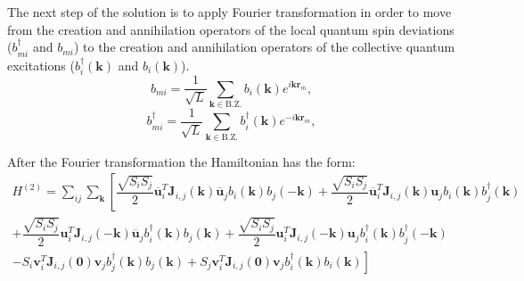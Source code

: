\documentclass[a4paper,12pt]{article}
\begin{document}
        The next step of the solution is to apply Fourier transformation in order to move from the creation and annihilation operators 
        of the local quantum spin deviations ($b^{\dag}_{mi}$ and $b_{mi}$) 
        to the creation and annihilation operators of the collective quantum excitations ($b_i^{\dag}(\boldsymbol{k})$ and $b_i(\boldsymbol{k})$).
        \begin{equation}
            b_{mi} = \dfrac{1}{\sqrt{L}}\sum_{\boldsymbol{k} \in \text{B.Z.}} b_i(\boldsymbol{k})e^{i\boldsymbol{k}\boldsymbol{r}_m},
        \end{equation}
        \begin{equation}
            b^{\dag}_{mi} = \dfrac{1}{\sqrt{L}}\sum_{\boldsymbol{k} \in \text{B.Z.}} b^{\dag}_i(\boldsymbol{k})e^{-i\boldsymbol{k}\boldsymbol{r}_m},
        \end{equation}

        After the Fourier transformation the Hamiltonian has the form:
        \begin{multline}
            H^{(2)} = \sum_{ij}\sum_{\boldsymbol{k}}\left[\dfrac{\sqrt{S_i S_j}}{2}\overline{\boldsymbol{u}}^T_i\boldsymbol{J}_{i,j}(\boldsymbol{k})\overline{\boldsymbol{u}}_jb_{i}(\boldsymbol{k})b_{j}(-\boldsymbol{k}) +
            \dfrac{\sqrt{S_i S_j}}{2} \overline{\boldsymbol{u}}^T_i\boldsymbol{J}_{i,j}(\boldsymbol{k})\boldsymbol{u}_j b_{i}(\boldsymbol{k})b^{\dag}_{j}(\boldsymbol{k})\right. \\+ 
            \dfrac{\sqrt{S_i S_j}}{2}\boldsymbol{u}^T_i\boldsymbol{J}_{i,j}(-\boldsymbol{k})\overline{\boldsymbol{u}}_jb^{\dag}_{i}(\boldsymbol{k})b_{j}(\boldsymbol{k}) +
            \dfrac{\sqrt{S_i S_j}}{2}\boldsymbol{u}^T_i\boldsymbol{J}_{i,j}(-\boldsymbol{k})\boldsymbol{u}_jb^{\dag}_{i}(\boldsymbol{k})b^{\dag}_{j}(-\boldsymbol{k}) \\-
            \left.S_i\boldsymbol{v}^T_i\boldsymbol{J}_{i,j}(\boldsymbol{0})\boldsymbol{v}_jb^{\dag}_{j}(\boldsymbol{k})b_{j}(\boldsymbol{k}) + 
            S_j\boldsymbol{v}^T_i\boldsymbol{J}_{i,j}(\boldsymbol{0})\boldsymbol{v}_jb^{\dag}_{i}(\boldsymbol{k})b_{i}(\boldsymbol{k})\right]
        \end{multline}
\end{document}
